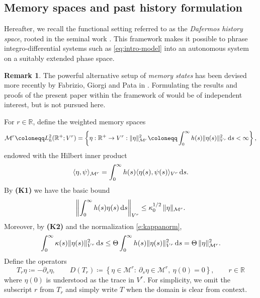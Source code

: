 \documentclass[12pt,leqno]{amsart}
\def\d{{\rm d}}
\def\R {\mathbb{R}}
\def \ps {\partial_s}
\theoremstyle{definition}
\newtheorem{remark}[theorem]{Remark}
\numberwithin{equation}{section}
\numberwithin{figure}{section}
\begin{document}
\subsection{Memory spaces and past history formulation}\label{subsec:memory-spaces} Hereafter, we recall the functional setting referred to as the  \emph{Dafermos history space}, rooted in the seminal work \cite{DAF}. This framework  makes it possible to phrase  integro-differential systems such as \eqref{eq:intro-model} into an autonomous system on a suitably extended phase space. 
\begin{remark} The powerful alternative setup of \emph{memory states} has been devised more recently by Fabrizio, Giorgi and Pata in \cite{FGP}. Formulating the results and proofs of the present paper within the framework of \cite{FGP} would be of independent interest, but is not pursued here. \end{remark}



For $r\in \mathbb R$, define the weighted memory spaces
\begin{equation}\label{eq:Mr-def}
{\mathcal M^{r}}\coloneqq L^{2}_{h}(\R^{+};{V^r})
=\left\{\eta:\R^{+}\to {V^r}: \|\eta\|^{2}_{{\mathcal M^{r}}}
\coloneqq\int_{0}^{\infty}h(s)\|\eta(s)\|^{2}_{{V^r}}\,\d s<\infty\right\},
\end{equation}
endowed with the Hilbert inner product
\[\langle\eta,\psi\rangle_{{\mathcal M^{r}}}
=\int_{0}^{\infty}h(s)\langle\eta(s),\psi(s)\rangle_{{V^r}}\,\d s.\]
By \textbf{(K1)} we have the basic bound
\begin{equation}\label{eq:memory-average-bound}
\left\|\int_{0}^{\infty}h(s)\eta(s)\,\d s\right\|_{{V^r}}
\le \kappa_{0}^{1/2}\,\|\eta\|_{{\mathcal M^{r}}}.
\end{equation}
Moreover, by \textbf{(K2)} and the normalization \eqref{e:kappanorm},
\begin{equation}\label{eq:kappa-vs-h}
\int_{0}^{\infty}\kappa(s)\|\eta(s)\|_{{V^r}}^{2}\,\d s
\le \Theta \int_{0}^{\infty}h(s)\|\eta(s)\|_{{V^r}}^{2}\,\d s
=\Theta\,\|\eta\|_{{\mathcal M^{r}}}^{2}.
\end{equation}
Define the operators
\[
T_r\eta\coloneqq -\ps\eta,
\qquad
D(T_r)\coloneqq\left\{\eta\in{\mathcal M^{r}}:\ \ps\eta\in{\mathcal M^{r}},\ \eta(0)=0\right\}, \qquad r\in \mathbb R
\]
where $\eta(0)$ is understood as the trace in ${V^r}$. For simplicity, we omit the subscript $r$ from $T_r$ and simply write $T$ when the domain is clear from context.
\end{document}
